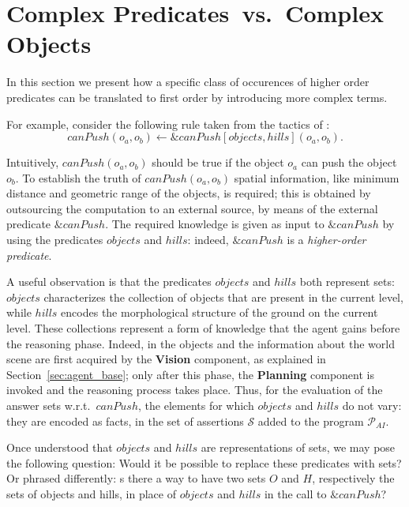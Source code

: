 \section{Complex Predicates~vs.~Complex Objects}
\label{sec:main}

In this section we present how a specific class of occurences of higher order predicates can be translated to first order by introducing more complex terms.

For example, consider the following rule taken from the tactics of \ah:
$$ canPush(o_a,o_b) \leftarrow \&canPush[objects,hills](o_a,o_b). \label{main:rule-1} $$

Intuitively, $canPush(o_a, o_b)$ should be true if the object $o_a$ can push the object $o_b$.
To establish the truth of $canPush(o_a, o_b)$ spatial information, like minimum distance and geometric range of the objects, is required; this is obtained by outsourcing the computation to an external source, by means of the external predicate $\&canPush$.
The required knowledge is given as input to $\&canPush$ by using the predicates $objects$ and $hills$: indeed, $\&canPush$ is a \emph{higher-order predicate}.

A useful observation is that the predicates $objects$ and $hills$ both represent sets: $objects$ characterizes the collection of objects that are present in the current level, while $hills$ encodes the morphological structure of the ground on the current level.
These collections represent a form of knowledge that the agent gains before the reasoning phase.
Indeed, in \ah the objects and the information about the world scene are first acquired by the \textbf{Vision} component, as explained in Section~\ref{sec:agent_base}; only after this phase, the \textbf{Planning} component is invoked and the reasoning process takes place.
Thus, for the evaluation of the answer sets w.r.t.\ $canPush$, the elements for which $objects$ and $hills$ do not vary: they are encoded as facts, in the set of assertions \(\mathcal{S}\) added to the program \(\mathcal{P}_{AI}\).

Once understood that $objects$ and $hills$ are representations of sets, we may pose the following question: Would it be possible to replace these predicates with sets?
Or phrased differently: s there a way to have two sets $O$ and $H$, respectively the sets of objects and hills, in place of  $objects$ and $hills$ in the call to $\&canPush$?

